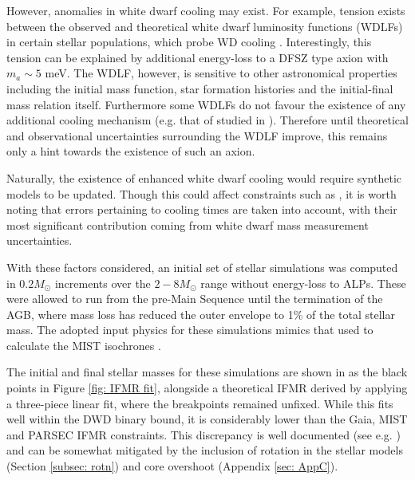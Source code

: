 However,  anomalies in white dwarf cooling may exist. For example, tension exists between the observed and theoretical white dwarf luminosity functions (WDLFs) in certain stellar populations, which probe WD cooling  \cite{Isern1992, Isern:2008nt, Isern:2018uce, Bertolami:2014wua}. Interestingly, this tension can be explained by additional energy-loss to a DFSZ \cite{DINE1981199, Zhitnitsky:1980tq} type axion with $m_a\sim5$ meV. The WDLF, however, is sensitive to other astronomical properties including the initial mass function, star formation histories and the initial-final mass relation itself. Furthermore some WDLFs do not favour the existence of any additional cooling mechanism (e.g. that of \cite{Harris_2006} studied in \cite{Bertolami:2014wua}). Therefore until theoretical and observational uncertainties surrounding the WDLF improve, this remains only a hint towards the existence of such an axion.

Naturally, the existence of enhanced white dwarf cooling would require synthetic models to be updated. Though this could affect constraints such as \cite{Andrews}, it is worth noting that errors pertaining to cooling times are taken into account, with their most significant contribution coming from white dwarf mass measurement uncertainties.


With these factors considered, an initial set of stellar simulations was computed in $0.2M_{\odot}$ increments over the $2-8M_{\odot}$ range without energy-loss to ALPs. These were allowed to run from the pre-Main Sequence until the termination of the AGB, where mass loss has reduced the outer envelope to 1\% of the total stellar mass. The adopted input physics for these simulations mimics that used to calculate the MIST isochrones \cite{MIST0, MIST1}.




The initial and final stellar masses for these simulations are shown in as the black points in Figure \ref{fig: IFMR fit}, alongside a theoretical IFMR derived by applying a three-piece linear fit, where the breakpoints remained unfixed. While this fits well within the DWD binary bound, it is considerably lower than the Gaia, MIST and PARSEC IFMR constraints. This discrepancy is well documented (see e.g. \cite{Cummings_2019}) and can be somewhat mitigated by the inclusion of rotation in the stellar models (Section \ref{subsec: rotn}) and core overshoot (Appendix \ref{sec: AppC}).





